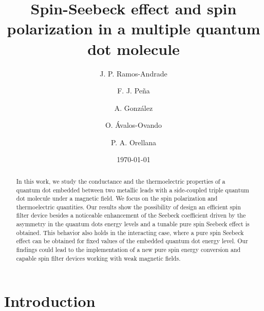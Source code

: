 \documentclass[aps,twocolumn,prb,superscript,floatfix,superscriptaddress,showpacs]{revtex4-1}
\begin{document}
\title{Spin-Seebeck effect and spin polarization in a multiple quantum dot molecule}
\author{J. P. Ramos-Andrade}
\author{F. J. Pe\~na}
\author{A. Gonz\'alez}
\author{O. \'Avalos-Ovando}
\author{P. A. Orellana}


\begin{abstract}
In this work, we study the conductance and the thermoelectric properties of a quantum dot embedded between two metallic leads with a side-coupled triple quantum dot molecule under a magnetic field. We focus on the spin polarization and thermoelectric quantities. Our results show the possibility of design an efficient spin filter device besides a noticeable enhancement of the Seebeck coefficient driven by the asymmetry in the quantum dots energy levels and a tunable pure spin Seebeck effect is obtained. This behavior also holds in the interacting case, where a pure spin Seebeck effect can be obtained for fixed values of the embedded quantum dot energy level. Our findings could lead to the implementation of a new  pure spin energy conversion and capable spin filter devices working with weak magnetic fields.

\end{abstract}
\pacs{}
\date{\today}
\maketitle

\section{Introduction}
\end{document}
